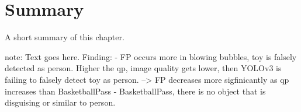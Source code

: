 \section{Summary}
\label{sec:results/summary}

A short summary of this chapter.


note:
Text goes here.
Finding:
- FP occurs more in blowing bubbles, toy is falsely detected as person. Higher the qp, image quality gets lower, then YOLOv3 is failing to falsely detect toy as person. --> FP decreases more sigfinicantly as qp increases than BasketballPass
- BasketballPass, there is no object that is disguising or similar to person.